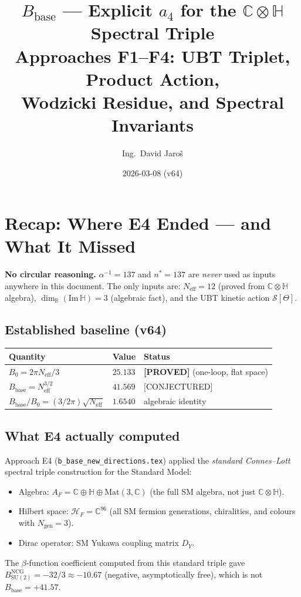 \documentclass[11pt,a4paper]{article}
\title{$B_{\mathrm{base}}$ — Explicit $a_4$ for the $\mathbb{C}\otimes\mathbb{H}$
    Spectral Triple\\
    \large Approaches F1--F4: UBT Triplet, Product Action,\\
    \large Wodzicki Residue, and Spectral Invariants}
\author{Ing.\ David Jaroš}
\date{2026-03-08 (v64)}
\theoremstyle{definition}
\theoremstyle{remark}
\begin{document}
  \maketitle
\fi

\section{Recap: Where E4 Ended — and What It Missed}
\label{sec:recap_e4}

\noindent\textbf{No circular reasoning.}
$\alpha^{-1} = 137$ and $n^* = 137$ are \emph{never} used as inputs
anywhere in this document.
The only inputs are: $N_{\mathrm{eff}} = 12$ (proved from
$\mathbb{C}\otimes\mathbb{H}$ algebra), $\dim_\mathbb{R}(\mathrm{Im}\,\mathbb{H}) = 3$
(algebraic fact), and the UBT kinetic action $\mathcal{S}[\Theta]$.

\subsection{Established baseline (v64)}

\begin{center}
\begin{tabular}{lll}
  \toprule
  Quantity & Value & Status \\
  \midrule
  $B_0 = 2\pi N_{\mathrm{eff}}/3$ & $25.133$ & \textbf{[PROVED]} (one-loop, flat space) \\
  $B_{\mathrm{base}} = N_{\mathrm{eff}}^{3/2}$ & $41.569$ & [CONJECTURED] \\
  $B_{\mathrm{base}}/B_0 = (3/2\pi)\sqrt{N_{\mathrm{eff}}}$ & $1.6540$ & algebraic identity \\
  \bottomrule
\end{tabular}
\end{center}

\subsection{What E4 actually computed}

Approach E4 (\texttt{b\_base\_new\_directions.tex}) applied the
\emph{standard Connes--Lott} spectral triple construction for the
Standard Model:
\begin{itemize}
  \item Algebra: $A_F = \mathbb{C} \oplus \mathbb{H} \oplus \mathrm{Mat}(3,\mathbb{C})$
    (the full SM algebra, not just $\mathbb{C}\otimes\mathbb{H}$).
  \item Hilbert space: $\mathcal{H}_F = \mathbb{C}^{96}$ (all SM fermion generations,
    chiralities, and colours with $N_{\mathrm{gen}} = 3$).
  \item Dirac operator: SM Yukawa coupling matrix $D_Y$.
\end{itemize}
The $\beta$-function coefficient computed from this standard triple gave
$B_{\mathrm{SU}(2)}^{\mathrm{NCG}} = -32/3 \approx -10.67$ (negative,
asymptotically free), which is not $B_{\mathrm{base}} = +41.57$.
\end{document}
